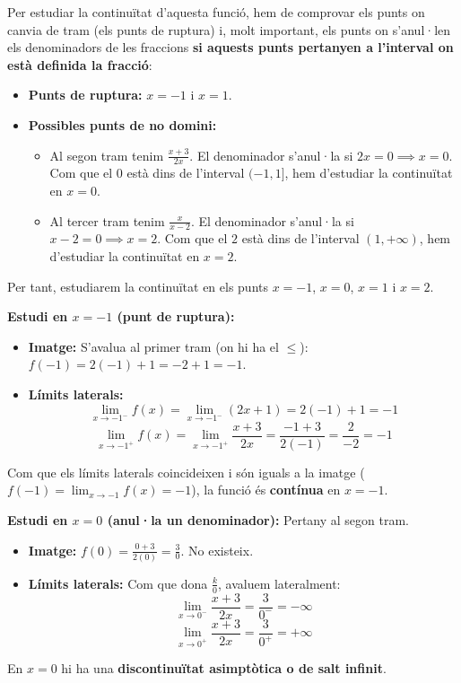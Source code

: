 \documentclass[12pt,a4paper]{article}
\begin{document}
Per estudiar la continuïtat d'aquesta funció, hem de comprovar els punts on canvia de tram (els punts de ruptura) i, molt important, els punts on s'anul·len els denominadors de les fraccions \textbf{si aquests punts pertanyen a l'interval on està definida la fracció}:
\begin{itemize}
    \item \textbf{Punts de ruptura:} $x = -1$ i $x = 1$.
    \item \textbf{Possibles punts de no domini:}
    \begin{itemize}
        \item Al segon tram tenim $\frac{x+3}{2x}$. El denominador s'anul·la si $2x = 0 \implies x = 0$. Com que el $0$ està dins de l'interval $(-1, 1]$, hem d'estudiar la continuïtat en $x = 0$.
        \item Al tercer tram tenim $\frac{x}{x-2}$. El denominador s'anul·la si $x - 2 = 0 \implies x = 2$. Com que el $2$ està dins de l'interval $(1, +\infty)$, hem d'estudiar la continuïtat en $x = 2$.
    \end{itemize}
\end{itemize}

Per tant, estudiarem la continuïtat en els punts $x = -1$, $x = 0$, $x = 1$ i $x = 2$.

\textbf{Estudi en $x = -1$ (punt de ruptura):}
\begin{itemize}
    \item \textbf{Imatge:} S'avalua al primer tram (on hi ha el $\le$): $f(-1) = 2(-1) + 1 = -2 + 1 = -1$.
    \item \textbf{Límits laterals:}
    \[ \lim_{x \to -1^-} f(x) = \lim_{x \to -1^-} (2x + 1) = 2(-1) + 1 = -1 \]
    \[ \lim_{x \to -1^+} f(x) = \lim_{x \to -1^+} \frac{x+3}{2x} = \frac{-1+3}{2(-1)} = \frac{2}{-2} = -1 \]
\end{itemize}
Com que els límits laterals coincideixen i són iguals a la imatge ($f(-1) = \lim_{x \to -1} f(x) = -1$), la funció és \textbf{contínua} en $x = -1$.

\textbf{Estudi en $x = 0$ (anul·la un denominador):}
Pertany al segon tram.
\begin{itemize}
    \item \textbf{Imatge:} $f(0) = \frac{0+3}{2(0)} = \frac{3}{0}$. No existeix.
    \item \textbf{Límits laterals:} Com que dona $\frac{k}{0}$, avaluem lateralment:
    \[ \lim_{x \to 0^-} \frac{x+3}{2x} = \frac{3}{0^-} = -\infty \]
    \[ \lim_{x \to 0^+} \frac{x+3}{2x} = \frac{3}{0^+} = +\infty \]
\end{itemize}
En $x = 0$ hi ha una \textbf{discontinuïtat asimptòtica o de salt infinit}.
\end{document}
